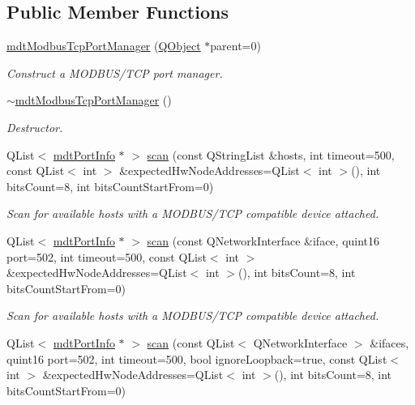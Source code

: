 \subsection*{Public Member Functions}
\begin{DoxyCompactItemize}
\item 
\hyperlink{classmdt_modbus_tcp_port_manager_a2f65f779bbad19d9d3f85ef35220ffb8}{mdt\-Modbus\-Tcp\-Port\-Manager} (\hyperlink{class_q_object}{Q\-Object} $\ast$parent=0)
\begin{DoxyCompactList}\small\item\em Construct a M\-O\-D\-B\-U\-S/\-T\-C\-P port manager. \end{DoxyCompactList}\item 
\hyperlink{classmdt_modbus_tcp_port_manager_aabe51a50a53c6b23884cc4862730b731}{$\sim$mdt\-Modbus\-Tcp\-Port\-Manager} ()
\begin{DoxyCompactList}\small\item\em Destructor. \end{DoxyCompactList}\item 
Q\-List$<$ \hyperlink{classmdt_port_info}{mdt\-Port\-Info} $\ast$ $>$ \hyperlink{classmdt_modbus_tcp_port_manager_a41d366dbf944346b6b0466d4618b9625}{scan} (const Q\-String\-List \&hosts, int timeout=500, const Q\-List$<$ int $>$ \&expected\-Hw\-Node\-Addresses=Q\-List$<$ int $>$(), int bits\-Count=8, int bits\-Count\-Start\-From=0)
\begin{DoxyCompactList}\small\item\em Scan for available hosts with a M\-O\-D\-B\-U\-S/\-T\-C\-P compatible device attached. \end{DoxyCompactList}\item 
Q\-List$<$ \hyperlink{classmdt_port_info}{mdt\-Port\-Info} $\ast$ $>$ \hyperlink{classmdt_modbus_tcp_port_manager_a5537ba29f5d54980a8c10bbd3e41bea5}{scan} (const Q\-Network\-Interface \&iface, quint16 port=502, int timeout=500, const Q\-List$<$ int $>$ \&expected\-Hw\-Node\-Addresses=Q\-List$<$ int $>$(), int bits\-Count=8, int bits\-Count\-Start\-From=0)
\begin{DoxyCompactList}\small\item\em Scan for available hosts with a M\-O\-D\-B\-U\-S/\-T\-C\-P compatible device attached. \end{DoxyCompactList}\item 
Q\-List$<$ \hyperlink{classmdt_port_info}{mdt\-Port\-Info} $\ast$ $>$ \hyperlink{classmdt_modbus_tcp_port_manager_a88b57abd1ce0b8017619c13fce4c695d}{scan} (const Q\-List$<$ Q\-Network\-Interface $>$ \&ifaces, quint16 port=502, int timeout=500, bool ignore\-Loopback=true, const Q\-List$<$ int $>$ \&expected\-Hw\-Node\-Addresses=Q\-List$<$ int $>$(), int bits\-Count=8, int bits\-Count\-Start\-From=0)

\end{DoxyCompactItemize}
